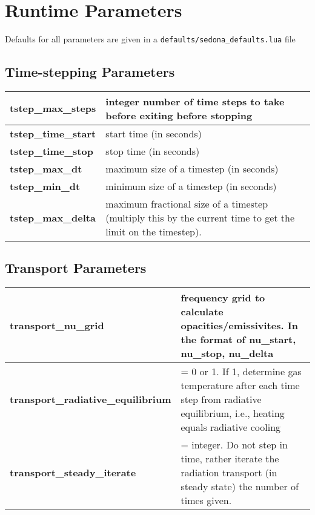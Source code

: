 

\chapter{Runtime Parameters}


Defaults for all parameters are given in a {\tt defaults/sedona\_defaults.lua} file

\section{Time-stepping Parameters}

\begin {table}[h]
\begin{tabular}{| >{\bf}l | p{12cm} |  }
\rowcolor{tableShade}
\hline
\hline
  tstep\_max\_steps    &  integer number of time steps to take before exiting before stopping \\ \hline
     tstep\_time\_start    & start time (in seconds) \\ \hline
   tstep\_time\_stop    & stop time (in seconds) \\ \hline
  tstep\_max\_dt        & maximum size of a timestep (in seconds)  \\ \hline
 tstep\_min\_dt          & minimum size of a timestep (in seconds)\\ \hline
 tstep\_max\_delta   &  maximum fractional size of a timestep (multiply this by 
 the current time to get the limit on the timestep). \\ \hline
\hline
\end{tabular}
\end{table}


\section{Transport Parameters}


\begin {table}[h]
\begin{tabular}{| >{\bf}l | p{10cm} |  }
\hline
\hline
transport\_nu\_grid  & frequency grid to calculate opacities/emissivites. In the format of {nu\_start, nu\_stop, nu\_delta} \\ \hline
transport\_radiative\_equilibrium  & = 0 or 1. If 1, determine gas temperature after each time step from radiative equilibrium, i.e., heating equals radiative cooling \\ \hline
transport\_steady\_iterate    & = integer. Do not step in time, rather iterate the radiation transport (in steady state) the number of times given. \\ \hline
\hline
\end{tabular}
\end{table}
